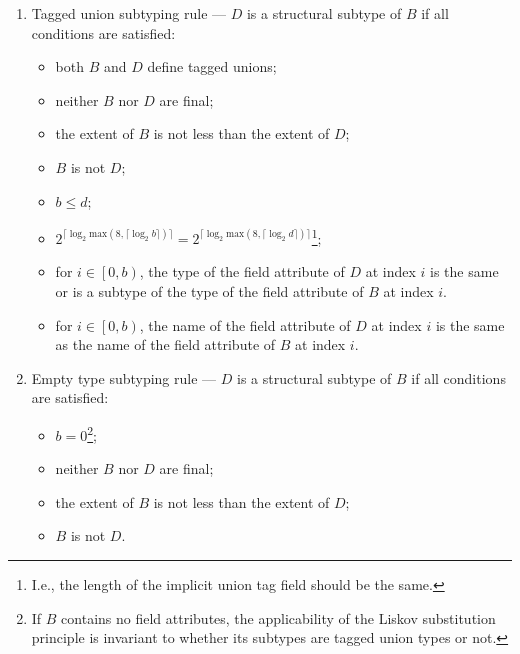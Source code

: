 \begin{enumerate}
    \item Tagged union subtyping rule --- $D$ is a structural subtype of $B$ if all conditions are satisfied:
    \begin{itemize}
        \item both $B$ and $D$ define tagged unions;
        \item neither $B$ nor $D$ are final;
        \item the extent of $B$ is not less than the extent of $D$;
        \item $B$ is not $D$;
        \item $b \leq d$;
        \item $2^{\lceil\log_2 \text{max}\left(8, \lceil\log_2 b\rceil\right)\rceil} =
               2^{\lceil\log_2 \text{max}\left(8, \lceil\log_2 d\rceil\right)\rceil}$\footnote{%
            I.e., the length of the implicit union tag field should be the same.
        };
        \item for $i \in \left[0, b\right)$, the type of the field attribute of $D$ at index $i$
        is the same or is a subtype of the type of the field attribute of $B$ at index $i$.
        \item for $i \in \left[0, b\right)$, the name of the field attribute of $D$ at index $i$
        is the same as the name of the field attribute of $B$ at index $i$.
    \end{itemize}

    \item Empty type subtyping rule --- $D$ is a structural subtype of $B$ if all conditions are satisfied:
    \begin{itemize}
        \item $b = 0$\footnote{%
            If $B$ contains no field attributes, the applicability of the Liskov substitution principle is invariant to
            whether its subtypes are tagged union types or not.
        };
        \item neither $B$ nor $D$ are final;
        \item the extent of $B$ is not less than the extent of $D$;
        \item $B$ is not $D$.
    \end{itemize}
\end{enumerate}

